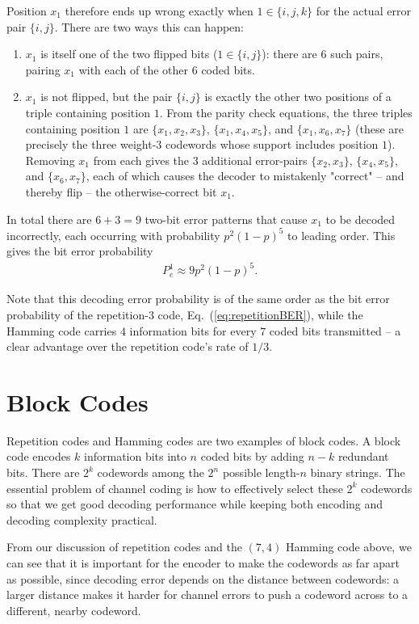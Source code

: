 Position \(x_1\) therefore ends up wrong exactly when \(1 \in \{i,j,k\}\) for the actual error pair \(\{i,j\}\). There are two ways this can happen:
\begin{enumerate}
    \item \(x_1\) is itself one of the two flipped bits ($1 \in \{i,j\}$): there are \(6\) such pairs, pairing \(x_1\) with each of the other \(6\) coded bits.
    \item \(x_1\) is not flipped, but the pair \(\{i,j\}\) is exactly the other two positions of a triple containing position \(1\). From the parity check equations, the three triples containing position \(1\) are \(\{x_1,x_2,x_3\}\), \(\{x_1,x_4,x_5\}\), and \(\{x_1,x_6,x_7\}\) (these are precisely the three weight-\(3\) codewords whose support includes position \(1\)). Removing \(x_1\) from each gives the \(3\) additional error-pairs \(\{x_2,x_3\}\), \(\{x_4,x_5\}\), and \(\{x_6,x_7\}\), each of which causes the decoder to mistakenly "correct" -- and thereby flip -- the otherwise-correct bit \(x_1\).
\end{enumerate}
In total there are \(6 + 3 = 9\) two-bit error patterns that cause \(x_1\) to be decoded incorrectly, each occurring with probability \(p^2(1-p)^5\) to leading order. This gives the bit error probability
\begin{align}
    P_{e}^{1} \approx 9 p^2 (1-p)^5. 
\end{align}

Note that this decoding error probability is of the same order as the bit error probability of the repetition-\(3\) code, Eq.~(\ref{eq:repetitionBER}), while the Hamming code carries \(4\) information bits for every \(7\) coded bits transmitted -- a clear advantage over the repetition code's rate of \(1/3\). 

\section{Block Codes}
Repetition codes and Hamming codes are two examples of block codes. A block code encodes \(k\) information bits into \(n\) coded bits by adding \(n-k\) redundant bits. There are \(2^k\) codewords among the \(2^n\) possible length-\(n\) binary strings. The essential problem of channel coding is how to effectively select these \(2^k\) codewords so that we get good decoding performance while keeping both encoding and decoding complexity practical.

From our discussion of repetition codes and the \((7,4)\) Hamming code above, we can see that it is important for the encoder to make the codewords as far apart as possible, since decoding error depends on the distance between codewords: a larger distance makes it harder for channel errors to push a codeword across to a different, nearby codeword.

